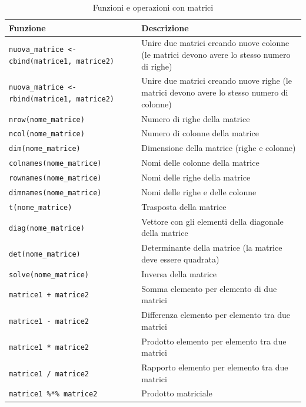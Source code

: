\documentclass[
]{book}
\begin{document}
\begin{table}[!h]

\caption{\label{tab:table-matrix-operators}Funzioni e operazioni con matrici}
\centering
\begin{tabular}[t]{l|l}
\hline
Funzione & Descrizione\\
\hline
\texttt{nuova\_matrice <- cbind(matrice1, matrice2)} & Unire due matrici creando nuove colonne (le matrici devono avere lo stesso numero di righe)\\
\hline
\texttt{nuova\_matrice <- rbind(matrice1, matrice2)} & Unire due matrici creando nuove righe (le matrici devono avere lo stesso numero di colonne)\\
\hline
\texttt{nrow(nome\_matrice)} & Numero di righe della matrice\\
\hline
\texttt{ncol(nome\_matrice)} & Numero di colonne della matrice\\
\hline
\texttt{dim(nome\_matrice)} & Dimensione della matrice (righe e colonne)\\
\hline
\texttt{colnames(nome\_matrice)} & Nomi delle colonne della matrice\\
\hline
\texttt{rownames(nome\_matrice)} & Nomi delle righe della matrice\\
\hline
\texttt{dimnames(nome\_matrice)} & Nomi delle righe e delle colonne\\
\hline
\texttt{t(nome\_matrice)} & Trasposta della matrice\\
\hline
\texttt{diag(nome\_matrice)} & Vettore con gli elementi della diagonale della matrice\\
\hline
\texttt{det(nome\_matrice)} & Determinante della matrice (la matrice deve essere quadrata)\\
\hline
\texttt{solve(nome\_matrice)} & Inversa della matrice\\
\hline
\texttt{matrice1 + matrice2} & Somma elemento per elemento di due matrici\\
\hline
\texttt{matrice1 - matrice2} & Differenza elemento per elemento tra due matrici\\
\hline
\texttt{matrice1 * matrice2} & Prodotto elemento per elemento tra due matrici\\
\hline
\texttt{matrice1 / matrice2} & Rapporto elemento per elemento tra due matrici\\
\hline
\texttt{matrice1 \%*\% matrice2} & Prodotto matriciale\\
\hline
\end{tabular}
\end{table}
\end{document}
